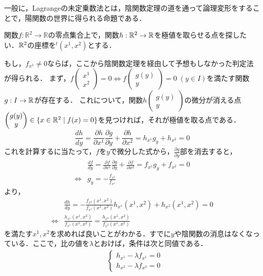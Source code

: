 \documentclass[uplatex, dvipdfmx]{jsreport}
\begin{document}
一般に，Lagrangeの未定乗数法とは，陰関数定理の道を通って論理変形をすることで，陽関数の世界に得られる命題である．
\begin{example}[２変数の場合のLagrangeの未定乗数法に全てがある]
    関数$f:\mathbb{R}^2\to\mathbb{R}$の零点集合上で，関数$h:\mathbb{R}^2\to\mathbb{R}$を極値を取らせる点を探したい．$\mathbb{R}^2$の座標を${}^t(x^1,x^2)$とする．

    もし，$f_{x^1}\ne 0$ならば，ここから陰関数定理を経由して予想もしなかった判定法が得られる．
    まず，$f\begin{pmatrix}x^1\\x^2\end{pmatrix}=0\Leftrightarrow f\begin{pmatrix}g(y)\\y\end{pmatrix}=0\;(y\in I)$を満たす関数$g:I\to\mathbb{R}$が存在する．
    これについて，関数$h\begin{pmatrix}g(y)\\y\end{pmatrix}$の微分が消える点$\begin{pmatrix}g(y)\\y\end{pmatrix}\in\{x\in\mathbb{R}^2\mid f(x)=0\}$を見つければ，それが極値を取る点である．
    \[ \frac{dh}{dy} = \frac{\partial h}{\partial x^1}\frac{\partial g}{\partial y}+\frac{\partial h}{\partial x^2}=h_{x^1}g_y+h_{x^2}=0 \]
    これを計算するに当たって，$f$を$y$で微分した式から，$\frac{\partial g}{\partial y}$部を消去すると，
    \begin{align*}
        &\frac{df}{dy} = \frac{\partial f}{\partial x^1}\frac{\partial g}{\partial y}+\frac{\partial f}{\partial x^2}=f_{x^1}g_y+f_{x^2}=0\\
        \Leftrightarrow& g_y=-\frac{f_{x^2}}{f_{x^1}}
    \end{align*}
    より，
    \begin{align*}
        &\frac{dh}{dy} = -\frac{f_{x^2}(x^1,x^2)}{f_{x^1}(x^1,x^2)}h_{x^1}(x^1,x^2)+h_{x^2}(x^1,x^2)=0\\
        \Leftrightarrow& \frac{h_{x^1}(x^1,x^2)}{f_{x^1}(x^1,x^2)} = \frac{h_{x^2}(x^1,x^2)}{f_{x^2}(x^1,x^2)}
    \end{align*}
    を満たす$x^1,x^2$を求めれば良いことがわかる．すでに$y$や陰関数の消息はなくなっている．ここで，比の値を$\lambda$とおけば，条件は次と同値である．
    \begin{align*}
        &\begin{cases}h_{x^1}-\lambda f_{x^1}=0\\h_{x^2}-\lambda f_{x^2}=0\end{cases}\\

\end{align*}
\end{example}
\end{document}
